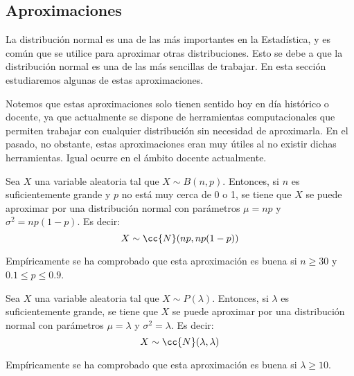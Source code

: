 \subsection{Aproximaciones}

La distribución normal es una de las más importantes en la Estadística, y es común que se utilice para aproximar otras distribuciones.
Esto se debe a que la distribución normal es una de las más sencillas de trabajar. En esta sección estudiaremos algunas de estas aproximaciones.

\begin{observacion}
    Notemos que estas aproximaciones solo tienen sentido hoy en día histórico o docente, ya que
    actualmente se dispone de herramientas computacionales que permiten trabajar con cualquier distribución sin necesidad de aproximarla.
    En el pasado, no obstante, estas aproximaciones eran muy útiles al no existir dichas herramientas.
    Igual ocurre en el ámbito docente actualmente.
\end{observacion}

\begin{prop}
    Sea $X$ una variable aleatoria tal que $X\sim B(n,p)$. Entonces, si $n$ es suficientemente grande y $p$ no está muy cerca de 0 o 1, se tiene que $X$
    se puede aproximar por una distribución normal con parámetros $\mu = np$ y $\sigma^2 = np(1-p)$. Es decir:
    \begin{equation*}
        X\sim \cc{N}(np,np(1-p))
    \end{equation*}

    Empíricamente se ha comprobado que esta aproximación es buena si $n\geq 30$ y $0.1\leq p\leq 0.9$.
\end{prop}


\begin{prop}
    Sea $X$ una variable aleatoria tal que $X\sim P(\lambda)$. Entonces, si $\lambda$ es suficientemente grande, se tiene que $X$
    se puede aproximar por una distribución normal con parámetros $\mu = \lambda$ y $\sigma^2 = \lambda$. Es decir:
    \begin{equation*}
        X\sim \cc{N}(\lambda,\lambda)
    \end{equation*}

    Empíricamente se ha comprobado que esta aproximación es buena si $\lambda\geq 10$.
\end{prop}



